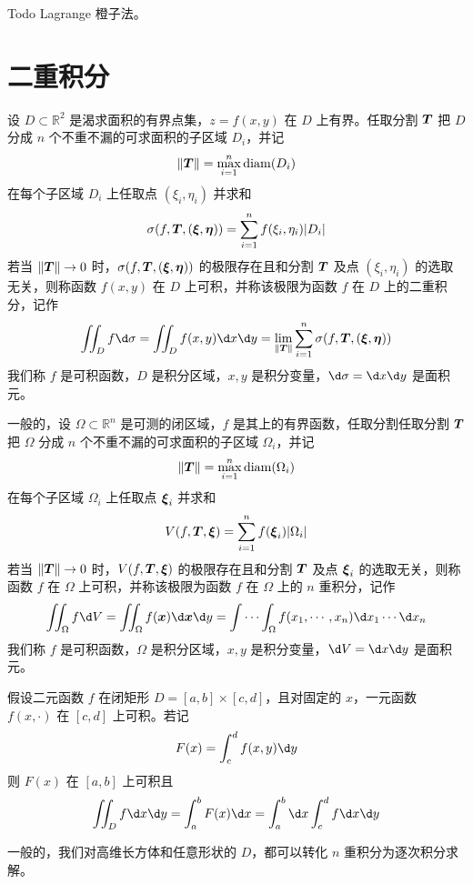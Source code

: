 Todo Lagrange 橙子法。

\section{二重积分}

\begin{definition}
	设 $D \subset \mathbb{R}^2$ 是渴求面积的有界点集，$z = f(x, y)$ 在 $D$ 上有界。任取分割 $\boldsymbol{T}$ 把 $D$ 分成 $n$ 个不重不漏的可求面积的子区域 $D_i$，并记
	\[ \| \boldsymbol{T} \| = \max_{i=1}^n \operatorname{diam}(D_i) \]
	在每个子区域 $D_i$ 上任取点 $(\xi_i, \eta_i)$ 并求和
	\[ \sigma(f, \boldsymbol{T}, (\boldsymbol{\xi}, \boldsymbol{\eta})) = \sum_{i=1}^n f(\xi_i, \eta_i) |D_i| \]
	若当 $\|\boldsymbol{T}\| \to 0$ 时，$\sigma(f, \boldsymbol{T}, (\boldsymbol{\xi}, \boldsymbol{\eta}))$ 的极限存在且和分割 $\boldsymbol{T}$ 及点 $(\xi_i, \eta_i)$ 的选取无关，则称函数 $f(x, y)$ 在 $D$ 上可积，并称该极限为函数 $f$ 在 $D$ 上的二重积分，记作
	\[ \iint_{D} f \d \sigma = \iint_{D} f(x, y) \d x \d y = \lim_{\| \vbf{T} \|} \sum_{i=1}^n \sigma(f, \vbf{T}, (\vbf{\xi}, \vbf{\eta})) \]
	我们称 $f$ 是可积函数，$D$ 是积分区域，$x, y$ 是积分变量，$\d \sigma = \d x \d y$ 是面积元。
\end{definition}

一般的，设 $\Omega \subset \mathbb{R}^n$ 是可测的闭区域，$f$ 是其上的有界函数，任取分割任取分割 $\boldsymbol{T}$ 把 $\Omega$ 分成 $n$ 个不重不漏的可求面积的子区域 $\Omega_i$，并记
\[ \| \boldsymbol{T} \| = \max_{i=1}^n \operatorname{diam}(\Omega_i) \]
在每个子区域 $\Omega_i$ 上任取点 $\boldsymbol{\xi}_i$ 并求和
\[ V(f, \boldsymbol{T}, \boldsymbol{\xi}) = \sum_{i=1}^n f(\boldsymbol{\xi}_i) |\Omega_i| \]
若当 $\|\boldsymbol{T}\| \to 0$ 时，$V(f, \boldsymbol{T}, \boldsymbol{\xi})$ 的极限存在且和分割 $\boldsymbol{T}$ 及点 $\boldsymbol{\xi}_i$ 的选取无关，则称函数 $f$ 在 $\Omega$ 上可积，并称该极限为函数 $f$ 在 $\Omega$ 上的 $n$ 重积分，记作
\[ \iint_{\Omega} f \d V = \iint_{\Omega} f(\vbf{x}) \d \vbf{x} \d y = \int \cdots \int_{\Omega} f(\seq{x}{n}) \d x_1 \cdots \d x_n \]
我们称 $f$ 是可积函数，$\Omega$ 是积分区域，$x, y$ 是积分变量，$\d V = \d x \d y$ 是面积元。

\begin{definition}[Fubini 定理]
	假设二元函数 $f$ 在闭矩形 $D = [a, b] \times [c, d]$，且对固定的 $x$，一元函数 $f(x, \cdot)$ 在 $[c, d]$ 上可积。若记
	\[ F(x) = \int_c^d f(x, y) \d y \]
	则 $F(x)$ 在 $[a, b]$ 上可积且
	\[ \iint_{D} f \d x \d y = \int_{a}^{b} F(x) \d x = \int_{a}^{b} \d x \int_{c}^{d} f \d x \d y \]
\end{definition}

一般的，我们对高维长方体和任意形状的 $D$，都可以转化 $n$ 重积分为逐次积分求解。

